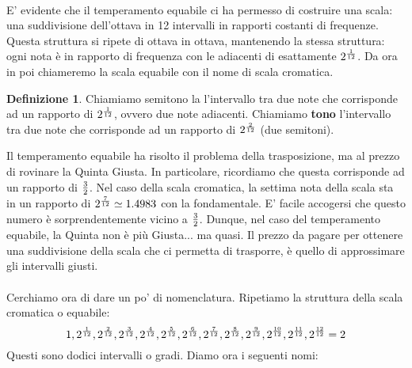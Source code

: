 \documentclass[12pt,a4paper]{book}
\theoremstyle{definition}
\newtheorem{Def}{Definizione}[chapter]
\theoremstyle{Theorem}
\theoremstyle{definition}
\theoremstyle{definition}
\theoremstyle{definition}
\begin{document}
	 \\
	 E' evidente che il temperamento equabile ci ha permesso di costruire una scala: una suddivisione dell'ottava in 12 intervalli in rapporti costanti di frequenze. Questa struttura si ripete di ottava in ottava, mantenendo la stessa struttura: ogni nota è in rapporto di frequenza con le adiacenti di esattamente $2^{1\over 12}$.
	 Da ora in poi chiameremo la scala equabile con il nome di scala cromatica. 
	 \begin{Def}
	 	Chiamiamo semitono la l'intervallo tra due note che corrisponde ad un rapporto di $2^{1\over12}$, ovvero due note adiacenti. Chiamiamo \textbf{tono} l'intervallo tra due note che corrisponde ad un rapporto di $2^{2\over 12}$ (due semitoni).
	 \end{Def} 
	 Il temperamento equabile ha risolto il problema della trasposizione, ma al prezzo di rovinare la Quinta Giusta. In particolare, ricordiamo che questa corrisponde ad un rapporto di $3\over 2$. Nel caso della scala cromatica, la settima nota della scala sta in un rapporto di $2^{7\over 12}\simeq 1.4983$ con la fondamentale. E' facile accogersi che questo numero è sorprendentemente vicino a $3\over 2$. Dunque, nel caso del temperamento equabile, la Quinta non è più Giusta... ma quasi. Il prezzo da pagare per ottenere una suddivisione della scala che ci permetta di trasporre, è quello di approssimare gli intervalli giusti.\\
	 \\
	 Cerchiamo ora di dare un po' di nomenclatura. Ripetiamo la struttura della scala cromatica o equabile:
	 $$1,2^{1\over12},2^{2\over12},2^{3\over12},2^{4\over12},2^{5\over12},2^{6\over12},2^{7\over12},2^{8\over12},2^{9\over12},2^{10\over12},2^{11\over12},2^{12\over12}=2$$
	 Questi sono dodici intervalli o gradi. Diamo ora i seguenti nomi:
\end{document}
